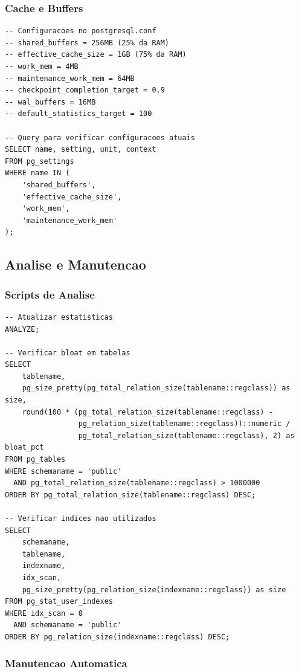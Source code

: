 \subsubsection{Cache e Buffers}

\begin{lstlisting}[caption=Configuracoes recomendadas para PostgreSQL]
-- Configuracoes no postgresql.conf
-- shared_buffers = 256MB (25% da RAM)
-- effective_cache_size = 1GB (75% da RAM)
-- work_mem = 4MB
-- maintenance_work_mem = 64MB
-- checkpoint_completion_target = 0.9
-- wal_buffers = 16MB
-- default_statistics_target = 100

-- Query para verificar configuracoes atuais
SELECT name, setting, unit, context 
FROM pg_settings 
WHERE name IN (
    'shared_buffers',
    'effective_cache_size', 
    'work_mem',
    'maintenance_work_mem'
);
\end{lstlisting}

\subsection{Analise e Manutencao}

\subsubsection{Scripts de Analise}

\begin{lstlisting}[caption=Scripts para analise de performance]
-- Atualizar estatisticas
ANALYZE;

-- Verificar bloat em tabelas
SELECT 
    tablename,
    pg_size_pretty(pg_total_relation_size(tablename::regclass)) as size,
    round(100 * (pg_total_relation_size(tablename::regclass) - 
                 pg_relation_size(tablename::regclass))::numeric / 
                 pg_total_relation_size(tablename::regclass), 2) as bloat_pct
FROM pg_tables 
WHERE schemaname = 'public'
  AND pg_total_relation_size(tablename::regclass) > 1000000
ORDER BY pg_total_relation_size(tablename::regclass) DESC;

-- Verificar indices nao utilizados
SELECT 
    schemaname,
    tablename,
    indexname,
    idx_scan,
    pg_size_pretty(pg_relation_size(indexname::regclass)) as size
FROM pg_stat_user_indexes
WHERE idx_scan = 0
  AND schemaname = 'public'
ORDER BY pg_relation_size(indexname::regclass) DESC;
\end{lstlisting}

\subsubsection{Manutencao Automatica}

